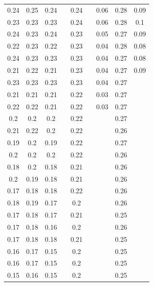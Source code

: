 \documentclass[AutoFakeBold]{LZUThesis}
\begin{document}
\begin{longtable}{ccccccccc}
0.24   & 0.25   & 0.24   &       & 0.24  &      & 0.06  & 0.28  & 0.09 \\
0.23   & 0.23   & 0.23   &       & 0.24  &      & 0.06  & 0.28  & 0.1  \\
0.24   & 0.23   & 0.24   &       & 0.23  &      & 0.05  & 0.27  & 0.09 \\
0.22   & 0.23   & 0.22   &       & 0.23  &      & 0.04  & 0.28  & 0.08 \\
0.24   & 0.23   & 0.23   &       & 0.23  &      & 0.04  & 0.27  & 0.08 \\
0.21   & 0.22   & 0.21   &       & 0.23  &      & 0.04  & 0.27  & 0.09 \\
0.23   & 0.23   & 0.23   &       & 0.23  &      & 0.04  & 0.27  &      \\
0.21   & 0.21   & 0.21   &       & 0.22  &      & 0.03  & 0.27  &      \\
0.22   & 0.22   & 0.21   &       & 0.22  &      & 0.03  & 0.27  &      \\
0.2    & 0.2    & 0.2    &       & 0.22  &      &       & 0.27  &      \\
0.21   & 0.22   & 0.2    &       & 0.22  &      &       & 0.26  &      \\
0.19   & 0.2    & 0.19   &       & 0.22  &      &       & 0.27  &      \\
0.2    & 0.2    & 0.2    &       & 0.22  &      &       & 0.26  &      \\
0.18   & 0.2    & 0.18   &       & 0.21  &      &       & 0.26  &      \\
0.2    & 0.19   & 0.18   &       & 0.21  &      &       & 0.26  &      \\
0.17   & 0.18   & 0.18   &       & 0.22  &      &       & 0.26  &      \\
0.18   & 0.19   & 0.17   &       & 0.2   &      &       & 0.26  &      \\
0.17   & 0.18   & 0.17   &       & 0.21  &      &       & 0.25  &      \\
0.17   & 0.18   & 0.16   &       & 0.2   &      &       & 0.26  &      \\
0.17   & 0.18   & 0.18   &       & 0.21  &      &       & 0.25  &      \\
0.16   & 0.17   & 0.15   &       & 0.2   &      &       & 0.25  &      \\
0.16   & 0.17   & 0.15   &       & 0.2   &      &       & 0.25  &      \\
0.15   & 0.16   & 0.15   &       & 0.2   &      &       & 0.25  &      \\

\end{longtable}
\end{document}
